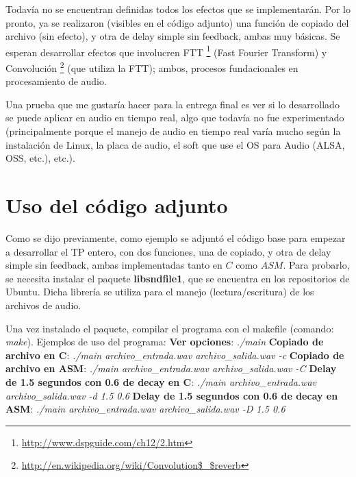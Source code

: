 \documentclass[a4paper,spanish,12pt]{article}
\begin{document}
\indent Todavía no se encuentran definidas todos los efectos que se implementarán. Por lo pronto, ya se realizaron (visibles en el código adjunto) una función de copiado del archivo (sin efecto), y otra de delay simple sin feedback, ambas muy básicas. Se esperan desarrollar efectos que involucren FTT \footnote{\url{http://www.dspguide.com/ch12/2.htm}} (Fast Fourier Transform) y Convolución \footnote{\url{http://en.wikipedia.org/wiki/Convolution$_$reverb}} (que utiliza la FTT); ambos, procesos fundacionales en procesamiento de audio.

\indent Una prueba que me gustaría hacer para la entrega final es ver si lo desarrollado se puede aplicar en audio en tiempo real, algo que todavía no fue experimentado (principalmente porque el manejo de audio en tiempo real varía mucho según la instalación de Linux, la placa de audio, el soft que use el OS para Audio (ALSA, OSS, etc.), etc.).

\section{Uso del código adjunto}
\indent Como se dijo previamente, como ejemplo se adjuntó el código base para empezar a desarrollar el TP entero, con dos funciones, una de copiado, y otra de delay simple sin feedback, ambas implementadas tanto en $C$ como $ASM$. Para probarlo, se necesita instalar el paquete \textbf{libsndfile1}, que se encuentra en los repositorios de Ubuntu. Dicha librería se utiliza para el manejo (lectura/escritura) de los archivos de audio.
 
\indent Una vez instalado el paquete, compilar el programa con el makefile (comando: \textit{make}). Ejemplos de uso del programa: \newline \newline
\textbf{Ver opciones}: \textit{./main} \newline
\textbf{Copiado de archivo en C}: \textit{./main archivo\_entrada.wav archivo\_salida.wav -c} \newline
\textbf{Copiado de archivo en ASM}: \textit{./main archivo\_entrada.wav archivo\_salida.wav -C} \newline
\textbf{Delay de 1.5 segundos con 0.6 de decay en C}: \textit{./main archivo\_entrada.wav archivo\_salida.wav -d 1.5 0.6} \newline
\textbf{Delay de 1.5 segundos con 0.6 de decay en ASM}: \textit{./main archivo\_entrada.wav archivo\_salida.wav -D 1.5 0.6} \newline\newline
\end{document}
